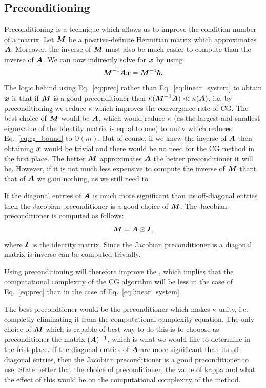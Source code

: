 \documentclass[useAMS,usenatbib]{mn2e}
\newcommand{\bA}{\bmath{A}}
\newcommand{\bM}{\bmath{M}}
\newcommand{\bI}{\bmath{I}}
\newcommand{\bb}{\bmath{b}}
\newcommand{\bx}{\bmath{x}}
\begin{document}
\subsection{Preconditioning}
Preconditioning is a technique which allows us to improve the condition number of a matrix. Let $\bM$ be a positive-definite Hermitian matrix which approximates $\bA$.
Moreover, the inverse of $\bM$ must also be much easier to compute than the inverse of $\bA$. We can now indirectly solve for $\bx$ by using 
\begin{equation}
\label{eq:prec}
\bM^{-1}\bA\bx = \bM^{-1}\bb.
\end{equation}
The logic behind using Eq.~\eqref{eq:prec} rather than Eq.~\eqref{eq:linear_system} to obtain $\bx$ is that if $\bM$ is a good preconditioner then $\kappa(\bM^{-1}\bA) \ll \kappa(\bA)$, i.e.
by preconditioning we reduce $\kappa$ which improves the convergence rate of CG. The best choice of $\bM$ would be $\bA$, which would reduce $\kappa$ (as the largest and smallest eignevalue of the Identity matrix is equal to one) to unity which reduces
Eq.~\eqref{eq:cg_bound} to $\mathbb{O}(m)$. But of course, if we knew the inverse of $\bA$ then obtaining $\bx$ would be trivial and there would be no need for the CG method in the first place. 
The better $\bM$ approximates $\bA$ the better preconditioner it will be. However, if it is not much less expensive to 
compute the inverse of $\bM$ thant that of $\bA$ we gain nothing, as we still need to 

If the diagonal entries of $\bA$ is much more significant than its off-diagonal entries then the 
Jacobian preconditioner is a good choice of $\bM$. The Jacobian preconditioner is computed as follows:
\begin{equation}
\bM = \bA\odot\bI, 
\end{equation}
where $\bI$ is the identity matrix. Since the Jacobian preconditioner is a diagonal matrix is inverse can be computed trivially.




Using preconditioning will therefore improve the 
, which 
implies that the computational complexity of the CG algorithm will be less in the case of  Eq.~\eqref{eq:prec} than in the case of Eq.~\eqref{eq:linear_system}. 

The best precondtioner would be the preconditioner which makes $\kappa$ unity, i.e. completly
eliminating it from the computational complexity equation. The only choice of $\bM$ which is capable of best way to do this is to chooose as preconditioner the matrix $(\bA)^{-1}$, which is what we would like to determine in the frist place.
If the diagonal entries of $\bA$ are more significant than its off-diagonal entries, then the Jacobian preconditioner is a good preconditioner to use. 
State better that the choice of preconditioner, the value of kappa and what the effect of this would be on the computational complexity of the method.
\end{document}

